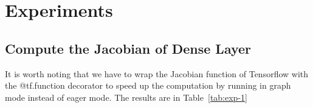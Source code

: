 \documentclass[14pt,twocolumn,letterpaper]{extarticle}
\begin{document}
\section{Experiments}

\subsection*{Compute the Jacobian of Dense Layer}

It is worth noting that we have to wrap the Jacobian function of Tensorflow with the @tf.function decorator to speed up the computation by running in graph mode instead of eager mode. The results are in Table~\ref{tab:exp-1}

\begin{table}[t]
    \centering
    \caption{Dense layer results.}\label{tab:exp-1}
    \end{table}



\end{document}
